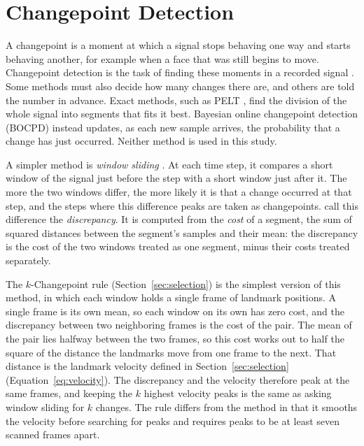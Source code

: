 
\section{Changepoint Detection}
\label{sec:changepoint}

A changepoint is a moment at which a signal stops behaving one way and starts behaving another, for example when a face that was still begins to move. Changepoint detection is the task of finding these moments in a recorded signal \cite{truong2020}. Some methods must also decide how many changes there are, and others are told the number in advance. Exact methods, such as PELT \cite{killick2012}, find the division of the whole signal into segments that fits it best. Bayesian online changepoint detection (BOCPD) \cite{adams2007} instead updates, as each new sample arrives, the probability that a change has just occurred. Neither method is used in this study.

A simpler method is \emph{window sliding} \cite[Section~5.2.1]{truong2020}. At each time step, it compares a short window of the signal just before the step with a short window just after it. The more the two windows differ, the more likely it is that a change occurred at that step, and the steps where this difference peaks are taken as changepoints.  call this difference the \emph{discrepancy}. It is computed from the \emph{cost} of a segment, the sum of squared distances between the segment's samples and their mean: the discrepancy is the cost of the two windows treated as one segment, minus their costs treated separately.

The $k$-Changepoint rule (Section~\ref{sec:selection}) is the simplest version of this method, in which each window holds a single frame of landmark positions. A single frame is its own mean, so each window on its own has zero cost, and the discrepancy between two neighboring frames is the cost of the pair. The mean of the pair lies halfway between the two frames, so this cost works out to half the square of the distance the landmarks move from one frame to the next. That distance is the landmark velocity defined in Section~\ref{sec:selection} (Equation~\ref{eq:velocity}). The discrepancy and the velocity therefore peak at the same frames, and keeping the $k$ highest velocity peaks is the same as asking window sliding for $k$ changes. The rule differs from the method in that it smooths the velocity before searching for peaks and requires peaks to be at least seven scanned frames apart.

